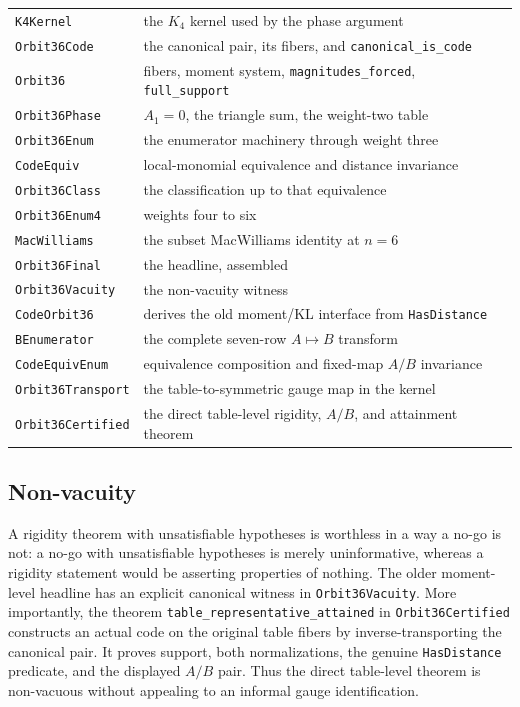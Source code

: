 \documentclass[11pt,a4paper]{article}
\newcommand{\lean}[1]{\texttt{#1}}
\theoremstyle{definition}
\begin{document}
\begin{center}
\begin{tabular}{ll}
\toprule
\lean{K4Kernel} & the $K_4$ kernel used by the phase argument \\
\lean{Orbit36Code} & the canonical pair, its fibers, and
                     \lean{canonical\_is\_code} \\
\lean{Orbit36} & fibers, moment system, \lean{magnitudes\_forced},
                 \lean{full\_support} \\
\lean{Orbit36Phase} & $A_1 = 0$, the triangle sum, the weight-two table \\
\lean{Orbit36Enum} & the enumerator machinery through weight three \\
\lean{CodeEquiv} & local-monomial equivalence and distance invariance \\
\lean{Orbit36Class} & the classification up to that equivalence \\
\lean{Orbit36Enum4} & weights four to six \\
\lean{MacWilliams} & the subset MacWilliams identity at $n = 6$ \\
\lean{Orbit36Final} & the headline, assembled \\
\lean{Orbit36Vacuity} & the non-vacuity witness \\
\lean{CodeOrbit36} & derives the old moment/KL interface from
                     \lean{HasDistance} \\
\lean{BEnumerator} & the complete seven-row $A\mapsto B$ transform \\
\lean{CodeEquivEnum} & equivalence composition and fixed-map $A/B$ invariance \\
\lean{Orbit36Transport} & the table-to-symmetric gauge map in the kernel \\
\lean{Orbit36Certified} & the direct table-level rigidity, $A/B$, and attainment theorem \\
\bottomrule
\end{tabular}
\end{center}

\subsection{Non-vacuity}

A rigidity theorem with unsatisfiable hypotheses is worthless in a way a no-go
is not: a no-go with unsatisfiable hypotheses is merely uninformative, whereas
a rigidity statement would be asserting properties of nothing.
The older moment-level headline has an explicit canonical witness in
\lean{Orbit36Vacuity}.  More importantly, the theorem
\lean{table\_representative\_attained} in \lean{Orbit36Certified} constructs an
actual code on the original table fibers by inverse-transporting the canonical
pair.  It proves support, both normalizations, the genuine \lean{HasDistance}
predicate, and the displayed $A/B$ pair.  Thus the direct table-level theorem
is non-vacuous without appealing to an informal gauge identification.
\end{document}
